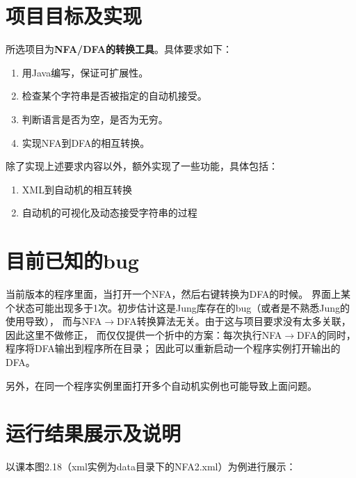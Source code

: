 \documentclass[12pt,a4paper]{article}
\begin{document}
\begin{CJK}{UTF8}{song}
    \section{项目目标及实现}
    所选项目为\textbf{NFA/DFA的转换工具}。具体要求如下：
    \begin{small}
    \begin{enumerate}
    \item 用Java编写，保证可扩展性。
    \item 检查某个字符串是否被指定的自动机接受。
    \item 判断语言是否为空，是否为无穷。
    \item 实现NFA到DFA的相互转换。
    \end{enumerate}
    \end{small}

    除了实现上述要求内容以外，额外实现了一些功能，具体包括：
    \begin{small}
    \begin{enumerate}
    \item XML到自动机的相互转换
    \item 自动机的可视化及动态接受字符串的过程
    \end{enumerate}
    \end{small}
    
    \section{目前已知的bug}
    当前版本的程序里面，当打开一个NFA，然后右键转换为DFA的时候。
    界面上某个状态可能出现多于1次。初步估计这是Jung库存在的bug（或者是不熟悉Jung的使用导致），
    而与NFA$\rightarrow$DFA转换算法无关。由于这与项目要求没有太多关联，因此这里不做修正，
    而仅仅提供一个折中的方案：每次执行NFA$\rightarrow$DFA的同时，程序将DFA输出到程序所在目录；
    因此可以重新启动一个程序实例打开输出的DFA。
    
    另外，在同一个程序实例里面打开多个自动机实例也可能导致上面问题。
    
    \section{运行结果展示及说明}
    以课本图2.18（xml实例为data目录下的NFA2.xml）为例进行展示：
    

\end{CJK}
\end{document}
